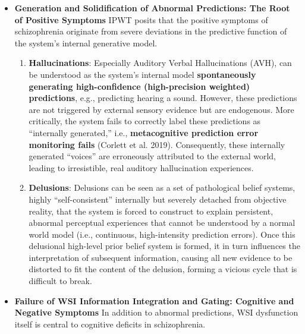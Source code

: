 \documentclass[
  a4paper]{article}
\providecommand{\tightlist}{%
  \setlength{\itemsep}{0pt}\setlength{\parskip}{0pt}}
\begin{document}
\begin{itemize}
\item
  \textbf{Generation and Solidification of Abnormal Predictions: The
  Root of Positive Symptoms} IPWT posits that the positive symptoms of
  schizophrenia originate from severe deviations in the predictive
  function of the system's internal generative model.

  \begin{enumerate}
  \def\labelenumi{\arabic{enumi}.}
  \tightlist
  \item
    \textbf{Hallucinations}: Especially Auditory Verbal Hallucinations
    (AVH), can be understood as the system's internal model
    \textbf{spontaneously generating high-confidence (high-precision
    weighted) predictions}, e.g., predicting hearing a sound. However,
    these predictions are not triggered by external sensory evidence but
    are endogenous. More critically, the system fails to correctly label
    these predictions as ``internally generated,'' i.e.,
    \textbf{metacognitive prediction error monitoring fails} (Corlett et
    al. 2019). Consequently, these internally generated ``voices'' are
    erroneously attributed to the external world, leading to
    irresistible, real auditory hallucination experiences.
  \item
    \textbf{Delusions}: Delusions can be seen as a set of pathological
    belief systems, highly ``self-consistent'' internally but severely
    detached from objective reality, that the system is forced to
    construct to explain persistent, abnormal perceptual experiences
    that cannot be understood by a normal world model (i.e., continuous,
    high-intensity prediction errors). Once this delusional high-level
    prior belief system is formed, it in turn influences the
    interpretation of subsequent information, causing all new evidence
    to be distorted to fit the content of the delusion, forming a
    vicious cycle that is difficult to break.
  \end{enumerate}
\item
  \textbf{Failure of WSI Information Integration and Gating: Cognitive
  and Negative Symptoms} In addition to abnormal predictions, WSI
  dysfunction itself is central to cognitive deficits in schizophrenia.


\end{itemize}
\end{document}
